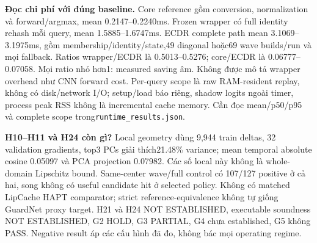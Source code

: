 \documentclass[11pt,a4paper]{article}
\newcommand{\code}[1]{{\small\ttfamily\nolinkurl{#1}}}
\theoremstyle{definition}
\begin{document}
\textbf{Đọc chi phí với đúng baseline.} Core reference gồm conversion,
normalization và forward/argmax, mean 0.2147--0.2240ms. Frozen wrapper có
full identity rehash mỗi query, mean 1.5885--1.6747ms. ECDR complete path
mean 3.1069--3.1975ms, gồm membership/identity/state,49 diagonal hoặc69
wave builds/run và mọi fallback. Ratios wrapper/ECDR là 0.5013--0.5276;
core/ECDR là 0.06777--0.07058. Mọi ratio nhỏ hơn1: measured saving âm.
Không được mô tả wrapper overhead như CNN forward cost. Per-query scope
là raw RAM-resident replay, không có disk/network I/O; setup/load báo riêng,
shadow logits ngoài timer, process peak RSS không là incremental cache memory.
Cần đọc mean/p50/p95 và complete scope trong\code{runtime_results.json}.

\textbf{H10--H11 và H24 còn gì?} Local geometry dùng 9,944 train deltas,
32 validation gradients, top3 PCs giải thích21.48\% variance; mean temporal
absolute cosine 0.05097 và PCA projection 0.07982. Các số local này không là
whole-domain Lipschitz bound. Same-center wave/full control có 107/127 positive
ở cả hai, song không có useful candidate hit ở selected policy. Không có
matched LipCache HAPT comparator; strict reference-equivalence không tự giống
GuardNet proxy target. H21 và H24 NOT ESTABLISHED, executable soundness NOT
ESTABLISHED, G2 HOLD, G3 PARTIAL, G4 chưa established, G5 không PASS.
Negative result áp các cấu hình đã đo, không bác mọi operating regime.

\end{document}
